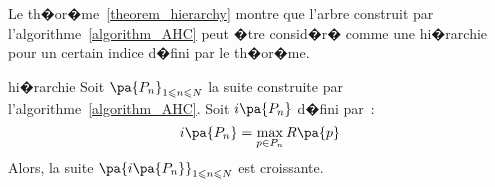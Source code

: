 Le th�or�me~\ref{theorem_hierarchy} montre que l'arbre construit par l'algorithme~\ref{algorithm_AHC} peut �tre
consid�r� comme une hi�rarchie pour un certain indice d�fini par le th�or�me.


            \begin{xtheorem}{hi�rarchie}\label{theorem_hierarchy}
            Soit $\pa{P_n}_{1 \leqslant n \leqslant N}$ la suite construite par l'algorithme~\ref{algorithm_AHC}. 
            Soit $i\pa{P_n}$ d�fini par~:
                $$
                i\pa{P_n} = \underset{p \in P_n} {\max} \, R\pa{p}
                $$
            Alors, la suite $\pa{i\pa{P_n}}_{1 \leqslant n \leqslant N}$ est croissante.
            \end{xtheorem}





